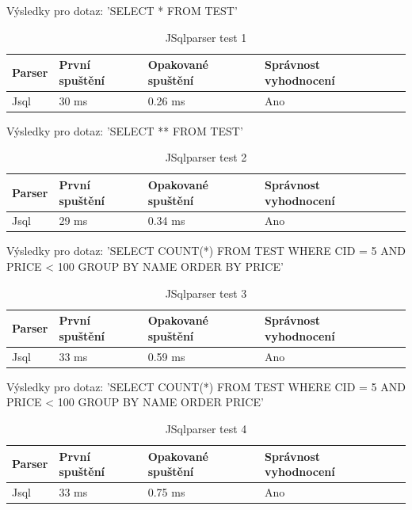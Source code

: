 \documentclass[czech,bachelor,public,dept460,male,cpdeclaration,twoside]{diploma}
\begin{document}
\begin{table}[!htbp]
	\centering
	\caption{JSqlparser test 1}
	Výsledky pro dotaz: 'SELECT * FROM TEST'
	\vskip 0.1cm
	\label{tab:jsql1}
	\begin{tabular}{lllll}
		\toprule
		Parser & První spuštění & Opakované spuštění & Správnost vyhodnocení\\
		\midrule
		Jsql & 30 ms & 0.26 ms & Ano \\
		\midrule
	\end{tabular}
\end{table}

\begin{table}[!htbp]
	\centering
	\caption{JSqlparser test 2}
	Výsledky pro dotaz: 'SELECT ** FROM TEST'
	\vskip 0.1cm
	\label{tab:jsql2}
	\begin{tabular}{lllll}
		\toprule
		Parser & První spuštění & Opakované spuštění & Správnost vyhodnocení\\
		\midrule
		Jsql & 29 ms & 0.34 ms & Ano \\
		\midrule
	\end{tabular}
\end{table}

\begin{table}[!htbp]
	\centering
	\caption{JSqlparser test 3}
	Výsledky pro dotaz: 'SELECT COUNT(*) FROM TEST WHERE CID = 5 AND PRICE < 100 GROUP BY NAME ORDER BY PRICE'
	\vskip 0.1cm
	\label{tab:jsql3}
	\begin{tabular}{lllll}
		\toprule
		Parser & První spuštění & Opakované spuštění & Správnost vyhodnocení\\
		\midrule
		Jsql & 33 ms & 0.59 ms & Ano \\
		\midrule
	\end{tabular}
\end{table}

\begin{table}[!htbp]
	\centering
	\caption{JSqlparser test 4}
	Výsledky pro dotaz: 'SELECT COUNT(*) FROM TEST WHERE CID = 5 AND PRICE < 100 GROUP BY NAME ORDER PRICE'
	\vskip 0.1cm
	\label{tab:jsql4}
	\begin{tabular}{lllll}
		\toprule
		Parser & První spuštění & Opakované spuštění & Správnost vyhodnocení\\
		\midrule
		Jsql & 33 ms & 0.75 ms & Ano \\
		\midrule
	\end{tabular}
\end{table}
\end{document}

